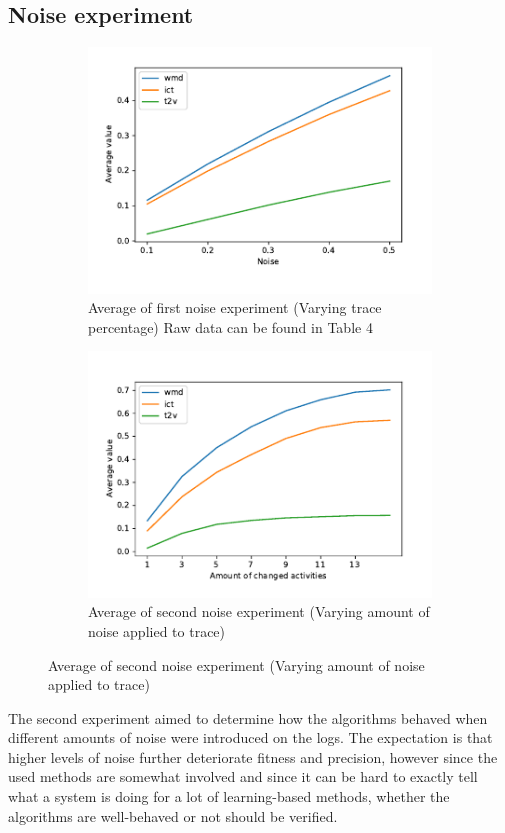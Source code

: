 \documentclass[runningheads]{template/llncs}
\begin{document}
\subsection{Noise experiment}
\begin{figure}
	\centering
	\begin{subfigure}[b]{0.49\textwidth}
		\centering
		\includegraphics[width=\textwidth]{figures/noise-first}
		\caption{Average of first noise experiment (Varying trace percentage) Raw data can be found in \cite{PBWe20} Table 4}
		\label{fig:noise-first}
	\end{subfigure}
	\hfill
	\begin{subfigure}[b]{0.49\textwidth}
		\centering
		\includegraphics[width=\textwidth]{figures/noise-second}
		\caption{Average of second noise experiment (Varying amount of noise applied to trace)}
		\label{fig:noise-second}
	\end{subfigure}
\end{figure}
The second experiment aimed to determine how the algorithms behaved when different amounts of noise were introduced on the logs.
The expectation is that higher levels of noise further deteriorate fitness and precision, however since the used methods are somewhat involved and since it can be hard to exactly tell what a system is doing for a lot of learning-based methods, whether the algorithms are well-behaved or not should be verified.
\end{document}

